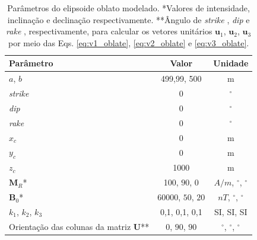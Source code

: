 \begin{table}[h!]
	\begin{center}
		\begin{tabular}{|l|c|c|}
			\hline
			\textbf{Parâmetro}  & \textbf{Valor} & \textbf{Unidade} \\
			\hline 
			$a$, $b$   & 499,99, 500 & m\\
			\hline
			\textit{strike}   & $0$ & $^{\circ}$\\
			\hline
			\textit{dip}    & $0$ & $^{\circ}$\\
			\hline
			\textit{rake}   & $0$  & $^{\circ}$\\
			\hline
			$x_c$   & 0  & m\\
			\hline          
			$y_c$   & 0  & m\\
			\hline                
			$z_c$   & 1000  & m\\
			\hline
			$\mathbf{M}_{R}$*  & 100, $90$, $0$  & $A/m$, $^{\circ}$, $^{\circ}$\\
			\hline
			$\mathbf{B}_{0}$*    & 60000, $50$, $20$ & $nT$, $^{\circ}$, $^{\circ}$ \\
			\hline
			$k_{1}$, $k_{2}$, $k_{3}$   & 0,1, 0,1, 0,1 & SI, SI, SI \\
			\hline
			Orientação das colunas da matriz $\mathbf{U}$**   & $0$, $90$, $90$ & $^{\circ}$, $^{\circ}$, $^{\circ}$ \\
			\hline
		\end{tabular}
		\caption{Parâmetros do elipsoide oblato modelado. *Valores de intensidade, inclinação e declinação respectivamente. **Ângulo de \textit{strike} , \textit{dip}  e \textit{rake} , respectivamente, para calcular os vetores unitários $\mathbf{u}_{1}$, $\mathbf{u}_{2}$, $\mathbf{u}_{3}$ por meio das Eqs. \ref{eq:v1_oblate}, \ref{eq:v2_oblate} e \ref{eq:v3_oblate}.}
	\end{center}
	\label{tab:triaxial_oblate2}
\end{table}

